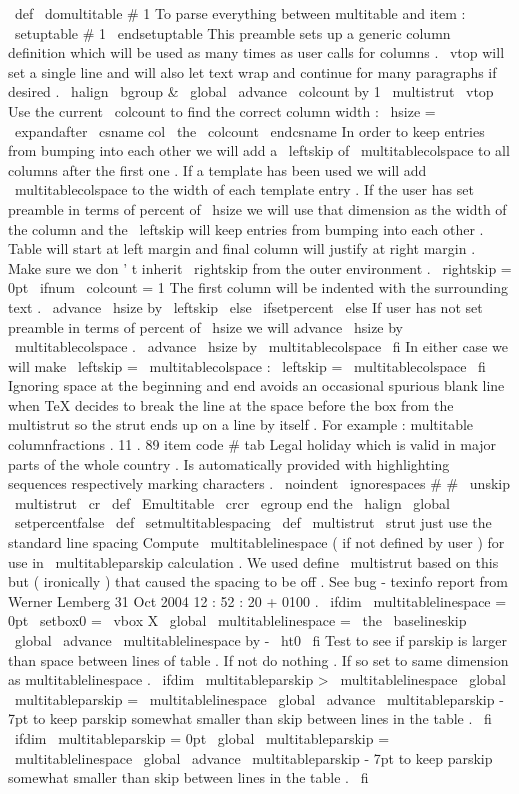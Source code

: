 \
def
\
domultitable
#
1
{
%
%
To
parse
everything
between
multitable
and
item
:
\
setuptable
#
1
\
endsetuptable
%
%
This
preamble
sets
up
a
generic
column
definition
which
will
%
be
used
as
many
times
as
user
calls
for
columns
.
%
\
vtop
will
set
a
single
line
and
will
also
let
text
wrap
and
%
continue
for
many
paragraphs
if
desired
.
\
halign
\
bgroup
&
%
\
global
\
advance
\
colcount
by
1
\
multistrut
\
vtop
{
%
%
Use
the
current
\
colcount
to
find
the
correct
column
width
:
\
hsize
=
\
expandafter
\
csname
col
\
the
\
colcount
\
endcsname
%
%
In
order
to
keep
entries
from
bumping
into
each
other
%
we
will
add
a
\
leftskip
of
\
multitablecolspace
to
all
columns
after
%
the
first
one
.
%
%
If
a
template
has
been
used
we
will
add
\
multitablecolspace
%
to
the
width
of
each
template
entry
.
%
%
If
the
user
has
set
preamble
in
terms
of
percent
of
\
hsize
we
will
%
use
that
dimension
as
the
width
of
the
column
and
the
\
leftskip
%
will
keep
entries
from
bumping
into
each
other
.
Table
will
start
at
%
left
margin
and
final
column
will
justify
at
right
margin
.
%
%
Make
sure
we
don
'
t
inherit
\
rightskip
from
the
outer
environment
.
\
rightskip
=
0pt
\
ifnum
\
colcount
=
1
%
The
first
column
will
be
indented
with
the
surrounding
text
.
\
advance
\
hsize
by
\
leftskip
\
else
\
ifsetpercent
\
else
%
If
user
has
not
set
preamble
in
terms
of
percent
of
\
hsize
%
we
will
advance
\
hsize
by
\
multitablecolspace
.
\
advance
\
hsize
by
\
multitablecolspace
\
fi
%
In
either
case
we
will
make
\
leftskip
=
\
multitablecolspace
:
\
leftskip
=
\
multitablecolspace
\
fi
%
Ignoring
space
at
the
beginning
and
end
avoids
an
occasional
spurious
%
blank
line
when
TeX
decides
to
break
the
line
at
the
space
before
the
%
box
from
the
multistrut
so
the
strut
ends
up
on
a
line
by
itself
.
%
For
example
:
%
multitable
columnfractions
.
11
.
89
%
item
code
{
#
}
%
tab
Legal
holiday
which
is
valid
in
major
parts
of
the
whole
country
.
%
Is
automatically
provided
with
highlighting
sequences
respectively
%
marking
characters
.
\
noindent
\
ignorespaces
#
#
\
unskip
\
multistrut
}
\
cr
}
\
def
\
Emultitable
{
%
\
crcr
\
egroup
%
end
the
\
halign
\
global
\
setpercentfalse
}
\
def
\
setmultitablespacing
{
%
\
def
\
multistrut
{
\
strut
}
%
just
use
the
standard
line
spacing
%
%
Compute
\
multitablelinespace
(
if
not
defined
by
user
)
for
use
in
%
\
multitableparskip
calculation
.
We
used
define
\
multistrut
based
on
%
this
but
(
ironically
)
that
caused
the
spacing
to
be
off
.
%
See
bug
-
texinfo
report
from
Werner
Lemberg
31
Oct
2004
12
:
52
:
20
+
0100
.
\
ifdim
\
multitablelinespace
=
0pt
\
setbox0
=
\
vbox
{
X
}
\
global
\
multitablelinespace
=
\
the
\
baselineskip
\
global
\
advance
\
multitablelinespace
by
-
\
ht0
\
fi
%
%
Test
to
see
if
parskip
is
larger
than
space
between
lines
of
%
%
table
.
If
not
do
nothing
.
%
%
If
so
set
to
same
dimension
as
multitablelinespace
.
\
ifdim
\
multitableparskip
>
\
multitablelinespace
\
global
\
multitableparskip
=
\
multitablelinespace
\
global
\
advance
\
multitableparskip
-
7pt
%
%
to
keep
parskip
somewhat
smaller
%
%
than
skip
between
lines
in
the
table
.
\
fi
%
\
ifdim
\
multitableparskip
=
0pt
\
global
\
multitableparskip
=
\
multitablelinespace
\
global
\
advance
\
multitableparskip
-
7pt
%
%
to
keep
parskip
somewhat
smaller
%
%
than
skip
between
lines
in
the
table
.
\
fi
}
